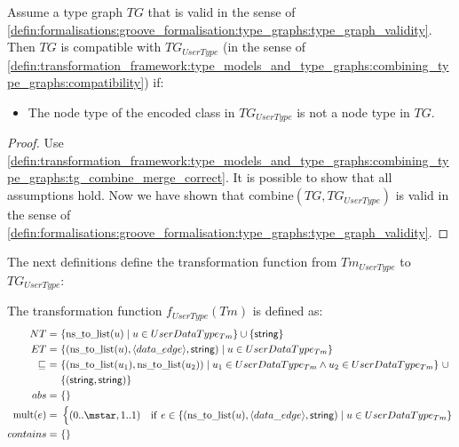 \begin{thm}
\label{defin:library_of_transformations:type_level_transformations:user_defined_data_types:tg_userdatatype_as_node_type_combine_correct}
Assume a type graph $TG$ that is valid in the sense of \cref{defin:formalisations:groove_formalisation:type_graphs:type_graph_validity}. Then $TG$ is compatible with $TG_{UserType}$ (in the sense of \cref{defin:transformation_framework:type_models_and_type_graphs:combining_type_graphs:compatibility}) if:
\begin{itemize}
    \item The node type of the encoded class in $TG_{UserType}$ is not a node type in $TG$.
\end{itemize}
\end{thm}

\begin{proof}
Use \cref{defin:transformation_framework:type_models_and_type_graphs:combining_type_graphs:tg_combine_merge_correct}. It is possible to show that all assumptions hold. Now we have shown that $\mathrm{combine}(TG, TG_{UserType})$ is valid in the sense of \cref{defin:formalisations:groove_formalisation:type_graphs:type_graph_validity}.
\end{proof}

The next definitions define the transformation function from $Tm_{UserType}$ to $TG_{UserType}$:

\begin{defin}
\label{defin:library_of_transformations:type_level_transformations:user_defined_data_types:tmod_userdatatype_to_tg_userdatatype_as_node_type}
The transformation function $f_{UserType}(Tm)$ is defined as:
\begin{align*}
NT =\ &\{\mathrm{ns\_\!to\_\!list}(u) \mid u \in UserDataType_{Tm}\} \cup \{\type{string}\} \\
ET =\ &\{(\mathrm{ns\_\!to\_\!list}(u), \langle data\_\!edge \rangle, \type{string}) \mid u \in UserDataType_{Tm}\}  \\
\!\!\sqsubseteq\ =\ &\{( \mathrm{ns\_\!to\_\!list}(u_1), \mathrm{ns\_\!to\_\!list}(u_2) ) \mid u_1 \in UserDataType_{Tm} \land u_2 \in UserDataType_{Tm} \}\ \cup\\& \{(\type{string}, \type{string})\} \\
abs =\ &\{\} \\
\mathrm{mult}(e) =\ &\begin{cases}
    (0..\mstar, 1..1) &\mathrm{if}\ e \in \{(\mathrm{ns\_\!to\_\!list}(u), \langle data\_edge \rangle, \type{string}) \mid u \in UserDataType_{Tm}\}
\end{cases}\\
contains =\ &\{\}
\end{align*}
\end{defin}

